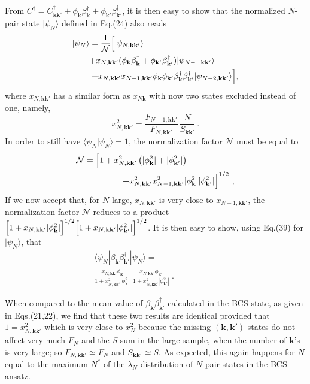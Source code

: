 \documentclass[twocolumn,showpacs]{revtex4}
\def\v#1{\mathbf{#1}}
\begin{document}
From $C^\dag=C_{\v k\v k'}^\dag+\phi_{\v k}\beta_{\v k}^\dag+\phi_{\v k'}\beta_{\v k'}^\dag$, it is then easy to show that the normalized $N$-pair state $|\psi_N\rangle$ defined in Eq.(24) also reads
\begin{eqnarray}
|\psi_N\rangle=\frac{1}{\mathcal{N}}\Big{[}|\psi_{N,\v k\v k'}\rangle\hspace{4cm}\nonumber\\
+x_{N,\v k\v k'}(\phi_{\v k}\beta_{\v k}^\dag+
\phi_{\v k'}\beta_{\v k'}^\dag)|\psi_{N-1,\v k\v k'}\rangle\hspace{1cm}\nonumber\\
+x_{N,\v k\v k'}x_{N-1,\v k\v k'}\phi_{\v k}\phi_{\v k'}\beta_{\v k}^\dag\beta_{\v k'}^\dag|\psi_{N-2,\v k\v k'}\rangle\Big{]},
\end{eqnarray}
where $x_{N,\v k\v k'}$ has a similar form as $x_{N\v k}$ with now two states excluded instead of one, namely,
\begin{equation}
x_{N,\v k\v k'}^2=\frac{F_{N-1,\v k\v k'}}{F_{N,\v k\v k'}}\,\frac{N}{S_{\v k\v k'}}\ .
\end{equation}
In order to still have $\langle\psi_N|\psi_N\rangle=1$, the normalization factor $\mathcal{N}$ must be equal to
\begin{eqnarray}
\mathcal{N}=\Big{[}1+x_{N,\v k\v k'}^2\left(|\phi_{\v k}^2|+|\phi_{\v k'}^2|\right)\hspace{2cm}\nonumber\\
+x_{N,\v k\v k'}^2x_{N-1,\v k\v k'}^2|\phi_{\v k}^2||\phi_{\v k'}^2|\Big{]}^{1/2}\ ,
\end{eqnarray}
If we now accept that, for $N$ large, $x_{N,\v k\v k'}$ is very close to $x_{N-1,\v k\v k'}$, the normalization factor $\mathcal{N}$ reduces to a product
$\Big{[}1+x_{N,\v k\v k'}|\phi_{\v k}^2|\Big{]}^{1/2}\Big{[}1+x_{N,\v k\v k'}|\phi_{\v k'}^2|\Big{]}^{1/2}$. It is then easy to show, using Eq.(39) for $|\psi_N\rangle$, that
\begin{eqnarray}
\langle\psi_N|\beta_{\v k}\beta_{\v k'}^\dag|\psi_N\rangle=\hspace{3cm}\nonumber\\
\frac{x_{N,\v k\v k'}\phi_{\v k}}{1+x_{N,\v k\v k'}^2|\phi_{\v k}^2|}\ 
\frac{x_{N,\v k\v k'}\phi_{\v k'}}{1+x_{N,\v k\v k'}^2|\phi_{\v k'}^2|}\ .
\end{eqnarray}

When compared to the mean value of $\beta_{\v k}^{}\beta_{\v k'}^\dag$  calculated in the BCS state, as given in Eqs.(21,22), we  find that these two results are identical provided that $1=x_{N,\v k\v k'}^2$ which is very close to $ x_N^2$ because the missing $(\v k , \v k')$ states do not affect very much $F_N$ and the $S$ sum in the large sample, when the number of $\v k$'s is very large; so $F_{N,\v k\v k'}\simeq F_N$ and $S_{\v k\v k'}\simeq S$. As expected, this again happens for $N$ equal to the maximum $N^\ast$ of the $\lambda_N$ distribution of $N$-pair states in the BCS ansatz.
\end{document}
